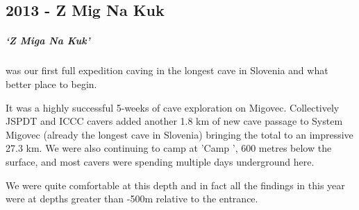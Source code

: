 \begin{tcolorbox}
	\chapter{2013 - Z Mig Na Kuk}
	\paragraph{‘Z Miga Na Kuk’} was our first full expedition caving in the longest cave in Slovenia and what better place to begin. 

It was a highly successful 5-weeks of cave exploration on Migovec. Collectively JSPDT and ICCC cavers added another 1.8 km of new cave passage to System Migovec (already the longest cave in Slovenia) bringing the total to an impressive 27.3 km. We were also continuing to camp at 'Camp \protect{}', 600 metres below the surface, and most cavers were spending multiple days underground here. 

We were quite comfortable at this depth and in fact all the findings in  this year were at depths greater than -500m relative to the entrance.

\end{tcolorbox}
\BgThispage
